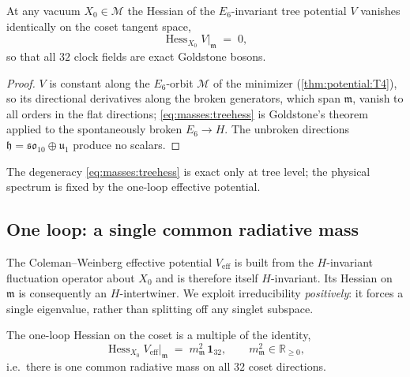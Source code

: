 \begin{theorem}\label{thm:masses:tree}
At any vacuum $X_{0}\in\mathcal{M}$ the Hessian of the $E_{6}$-invariant
tree potential $V$ vanishes identically on the coset tangent space,
\begin{equation}\label{eq:masses:treehess}
  \operatorname{Hess}_{X_{0}}V\big|_{\mathfrak m} \;=\; 0,
\end{equation}
so that all $32$ clock fields are exact Goldstone bosons.
\end{theorem}

\begin{proof}
$V$ is constant along the $E_{6}$-orbit $\mathcal{M}$ of the minimizer
(\autoref{thm:potential:T4}), so its directional derivatives along the
broken generators, which span $\mathfrak m$, vanish to all orders in the
flat directions; \eqref{eq:masses:treehess} is Goldstone's theorem applied to
the spontaneously broken $E_{6}\to H$. The unbroken directions
$\mathfrak h=\mathfrak{so}_{10}\oplus\mathfrak u_{1}$ produce no scalars.
\end{proof}

The degeneracy \eqref{eq:masses:treehess} is exact only at tree level; the
physical spectrum is fixed by the one-loop effective potential.

\subsection{One loop: a single common radiative mass}
\label{sec:masses:oneloop}

The Coleman--Weinberg effective potential $V_{\mathrm{eff}}$ is built from the
$H$-invariant fluctuation operator about $X_{0}$ and is therefore itself
$H$-invariant. Its Hessian on $\mathfrak m$ is consequently an
$H$-intertwiner. We exploit irreducibility \emph{positively}: it forces a
single eigenvalue, rather than splitting off any singlet subspace.

\begin{theorem}\label{thm:masses:schur}
The one-loop Hessian on the coset is a multiple of the identity,
\begin{equation}\label{eq:masses:schur}
  \operatorname{Hess}_{X_{0}}V_{\mathrm{eff}}\big|_{\mathfrak m}
  \;=\; m_{\mathfrak m}^{2}\,\mathbf 1_{32},
  \qquad m_{\mathfrak m}^{2}\in\mathbb R_{\ge 0},
\end{equation}
i.e.\ there is one common radiative mass on all $32$ coset directions.
\end{theorem}

